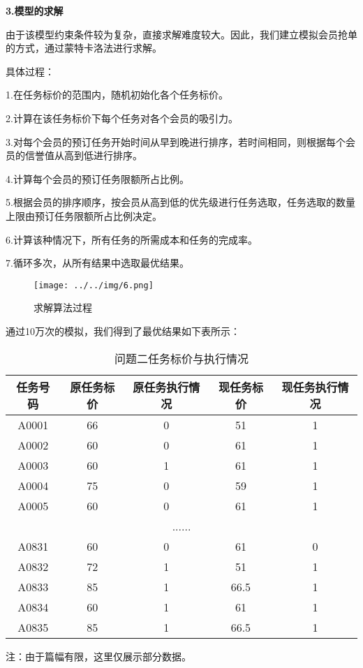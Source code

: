 \documentclass[withoutpreface,bwprint]{cumcmthesis} %
\begin{document}
\textbf{3.模型的求解}

由于该模型约束条件较为复杂，直接求解难度较大。因此，我们建立模拟会员抢单的方式，通过蒙特卡洛法进行求解。

具体过程：

1.在任务标价的范围内，随机初始化各个任务标价。

2.计算在该任务标价下每个任务对各个会员的吸引力。

3.对每个会员的预订任务开始时间从早到晚进行排序，若时间相同，则根据每个会员的信誉值从高到低进行排序。

4.计算每个会员的预订任务限额所占比例。

5.根据会员的排序顺序，按会员从高到低的优先级进行任务选取，任务选取的数量上限由预订任务限额所占比例决定。

6.计算该种情况下，所有任务的所需成本和任务的完成率。

7.循环多次，从所有结果中选取最优结果。

\begin{figure}[H]
	\small
	\centering
	\texttt{[image: ../../img/6.png]}
	\caption{求解算法过程} 
\end{figure}

通过10万次的模拟，我们得到了最优结果如下表所示：

\begin{table}[H]
	\centering
	\caption{问题二任务标价与执行情况}
	\begin{threeparttable}       
	\begin{tabular}{|c|c|c|c|c|}
	\hline
	任务号码  & 原任务标价 & 原任务执行情况 & 现任务标价 & 现任务执行情况 \\ \hline
	A0001 & 66    & 0       & 51    & 1       \\ \hline
	A0002 & 60    & 0       & 61    & 1       \\ \hline
	A0003 & 60    & 1       & 61    & 1       \\ \hline
	A0004 & 75    & 0       & 59    & 1       \\ \hline
	A0005 & 60    & 0       & 61    & 1       \\ \hline
	\multicolumn{5}{|c|}{......}              \\ \hline
	A0831 & 60    & 0       & 61    & 0       \\ \hline
	A0832 & 72    & 1       & 51    & 1       \\ \hline
	A0833 & 85    & 1       & 66.5  & 1       \\ \hline
	A0834 & 60    & 1       & 61    & 1       \\ \hline
	A0835 & 85    & 1       & 66.5  & 1       \\ \hline
	\end{tabular}
	\begin{tablenotes}
		\footnotesize
		\item 注：由于篇幅有限，这里仅展示部分数据。
	\end{tablenotes}
\end{threeparttable}     
\end{table}
\end{document}
